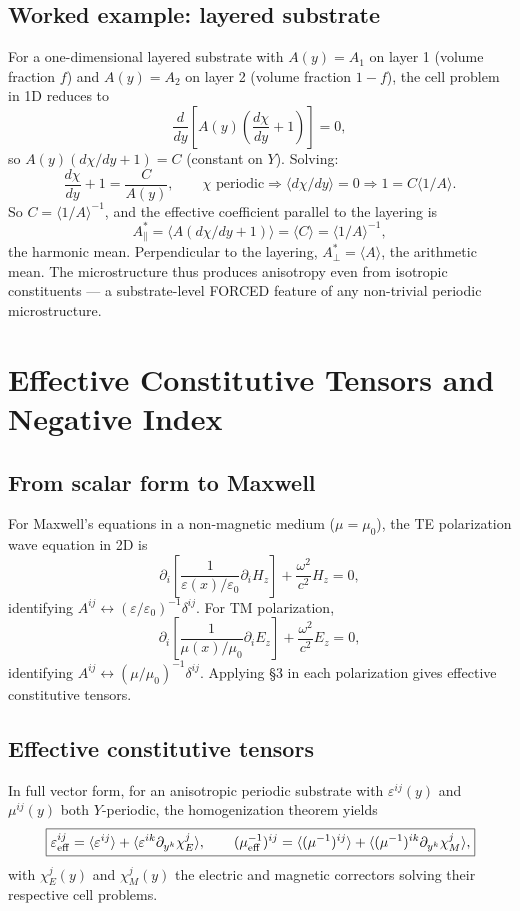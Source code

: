 \documentclass[11pt,a4paper]{article}
\begin{document}
\subsection{Worked example: layered substrate}

For a one-dimensional layered substrate with $A(y) = A_1$ on layer 1 (volume fraction $f$) and $A(y) = A_2$ on layer 2 (volume fraction $1 - f$), the cell problem in 1D reduces to
\[
\frac{d}{dy}\!\left[A(y)\left(\frac{d\chi}{dy} + 1\right)\right] = 0,
\]
so $A(y)(d\chi/dy + 1) = C$ (constant on $Y$). Solving:
\[
\frac{d\chi}{dy} + 1 = \frac{C}{A(y)}, \qquad \chi \text{ periodic} \Rightarrow \langle d\chi/dy\rangle = 0 \Rightarrow 1 = C\langle 1/A\rangle.
\]
So $C = \langle 1/A\rangle^{-1}$, and the effective coefficient parallel to the layering is
\[
A^*_\parallel = \langle A(d\chi/dy + 1)\rangle = \langle C\rangle = \langle 1/A\rangle^{-1},
\]
the harmonic mean. Perpendicular to the layering, $A^*_\perp = \langle A\rangle$, the arithmetic mean. The microstructure thus produces anisotropy even from isotropic constituents --- a substrate-level FORCED feature of any non-trivial periodic microstructure.

\section{Effective Constitutive Tensors and Negative Index}

\subsection{From scalar form to Maxwell}

For Maxwell's equations in a non-magnetic medium ($\mu = \mu_0$), the TE polarization wave equation in 2D is
\[
\partial_i\!\left[\frac{1}{\varepsilon(x)/\varepsilon_0}\partial_i H_z\right] + \frac{\omega^2}{c^2} H_z = 0,
\]
identifying $A^{ij} \leftrightarrow (\varepsilon/\varepsilon_0)^{-1}\delta^{ij}$. For TM polarization,
\[
\partial_i\!\left[\frac{1}{\mu(x)/\mu_0}\partial_i E_z\right] + \frac{\omega^2}{c^2} E_z = 0,
\]
identifying $A^{ij} \leftrightarrow (\mu/\mu_0)^{-1}\delta^{ij}$. Applying \S3 in each polarization gives effective constitutive tensors.

\subsection{Effective constitutive tensors}

In full vector form, for an anisotropic periodic substrate with $\varepsilon^{ij}(y)$ and $\mu^{ij}(y)$ both $Y$-periodic, the homogenization theorem yields
\[
\boxed{\varepsilon_{\rm eff}^{ij} = \langle\varepsilon^{ij}\rangle + \langle\varepsilon^{ik}\partial_{y^k}\chi_E^j\rangle, \qquad (\mu_{\rm eff}^{-1})^{ij} = \langle(\mu^{-1})^{ij}\rangle + \langle(\mu^{-1})^{ik}\partial_{y^k}\chi_M^j\rangle,}
\]
with $\chi_E^j(y)$ and $\chi_M^j(y)$ the electric and magnetic correctors solving their respective cell problems.
\end{document}
